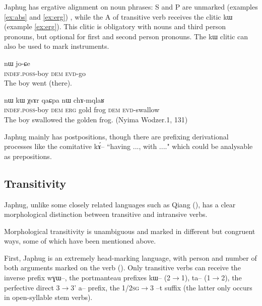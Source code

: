 \documentclass[oldfontcommands,oneside,a4paper,11pt]{article}
\newcommand{\ipa}[1]{{\phon #1}} %
\begin{document}
Japhug has ergative alignment on noun phrases:  S and P are unmarked (examples \ref{ex:abs} and \ref{ex:erg}) , while the A of transitive verb receives the clitic \ipa{kɯ} (example \ref{ex:erg}). This clitic is obligatory with nouns and third person pronouns, but optional for first and second person pronouns. The \ipa{kɯ} clitic can also be used to mark instruments.

\begin{exe}
\ex \label{ex:abs}
\gll \ipa{tɤ-tɕɯ}  	\ipa{nɯ}  	 	\ipa{jo-ɕe}   \\
\textsc{indef.poss}-boy \textsc{dem}   \textsc{evd}-go \\
\glt The boy went (there).
\end{exe}

\begin{exe}
\ex \label{ex:erg}
\gll \ipa{tɤ-tɕɯ}  	\ipa{nɯ}  	\ipa{kɯ}  	\ipa{χsɤr}  	\ipa{qaɕpa}  	\ipa{nɯ}  	\ipa{chɤ-mqlaʁ}   \\
\textsc{indef.poss}-boy \textsc{dem} \textsc{erg} gold frog \textsc{dem} \textsc{evd}-swallow \\
\glt The boy swallowed the golden frog. (Nyima Wodzer.1, 131)
\end{exe}


Japhug mainly has postpositions, though there are prefixing derivational processes like the comitative \ipa{kɤ́--} ``having ..., with ...." which could be analysable as prepositions.

\subsection{Transitivity} \label{sec:trans}

Japhug, unlike some closely related languages such as Qiang (\citealt{lapolla11transitivity}), has a clear morphological distinction between transitive and intransive verbs. 

  Morphological transitivity is unambiguous and  marked in   different but congruent  ways, some of which have been mentioned above.

First,  Japhug  is an extremely head-marking language, with person and number of both arguments marked on the verb (\citealt{jacques10inverse}). Only transitive verbs can receive the inverse prefix \ipa{wɣɯ}--, the portmanteau prefixes \ipa{kɯ}-- (2$\rightarrow$1), \ipa{ta}-- (1$\rightarrow$2), the perfective direct 3$\rightarrow$3'  \ipa{a}-- prefix,  the 1/\textsc{2sg}$\rightarrow$3 --\ipa{t} suffix (the latter only occurs in open-syllable stem verbs).
\end{document}
